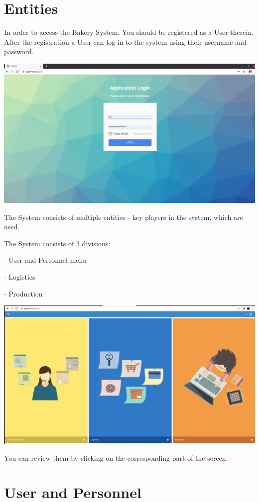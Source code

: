 \section{Entities}\label{sec:01}
In order to access the Bakery System, You should be registered as a User therein. 
After the registration a User can log in to the system using their username and password.

\includegraphics[width=\textwidth]{sections/01-chapter/images/login.png}

The System consists of multiple entities - key players in the system, which are used.

The System consists of 3 divisions:

- User and Personnel menu

- Logistics

- Production

\includegraphics[width=\textwidth]{sections/01-chapter/images/main.png}


You can review them by clicking on the corresponding part of the screen.

\section{User and Personnel}

